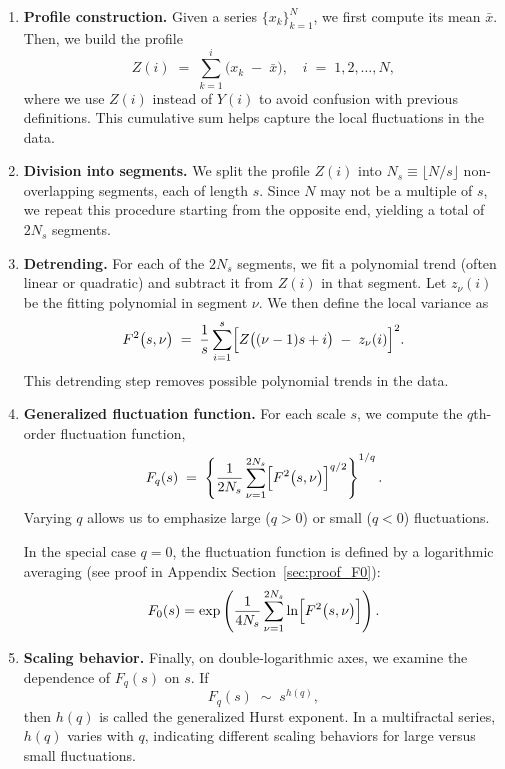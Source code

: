 \documentclass[11pt]{extarticle}
\begin{document}
\begin{enumerate}
    \item \textbf{Profile construction.} Given a series \(\{x_k\}_{k=1}^N\), we first compute its mean \(\bar{x}\). Then, we build the profile
    \begin{equation}
        Z(i) \;=\; \sum_{k=1}^{i} \bigl(x_k \;-\; \bar{x}\bigr), \quad i \;=\; 1,2,\dots,N,
    \end{equation}
    where we use \(Z(i)\) instead of \(Y(i)\) to avoid confusion with previous definitions. This cumulative sum helps capture the local fluctuations in the data.

    \item \textbf{Division into segments.} We split the profile \(Z(i)\) into \(N_s \equiv \lfloor N/s \rfloor\) non-overlapping segments, each of length \(s\). Since \(N\) may not be a multiple of \(s\), we repeat this procedure starting from the opposite end, yielding a total of \(2N_s\) segments.

    \item \textbf{Detrending.} For each of the \(2N_s\) segments, we fit a polynomial trend (often linear or quadratic) and subtract it from \(Z(i)\) in that segment. Let \(z_\nu(i)\) be the fitting polynomial in segment \(\nu\). We then define the local variance as
    \begin{equation}
        F^2\bigl(s,\nu\bigr)
        \;=\;
        \frac{1}{s} \sum_{i=1}^s \Bigl[ Z\bigl((\nu-1)s + i\bigr) \;-\; z_\nu(i) \Bigr]^2.
    \end{equation}
    This detrending step removes possible polynomial trends in the data.

    \item \textbf{Generalized fluctuation function.} For each scale \(s\), we compute the \(q\)th-order fluctuation function,
    \begin{equation}
        F_q(s)
        \;=\;
        \left\{
          \frac{1}{2N_s} \sum_{\nu=1}^{2N_s} \Bigl[ F^2\bigl(s,\nu\bigr) \Bigr]^{q/2}
        \right\}^{1/q}.
    \end{equation}
    Varying \(q\) allows us to emphasize large (\(q>0\)) or small (\(q<0\)) fluctuations.

    In the special case \(q=0\), the fluctuation function is defined by a logarithmic averaging (see proof in Appendix Section~\ref{sec:proof_F0}):
    \begin{equation}
        F_0(s) = \exp\left(\frac{1}{4N_s} \sum_{\nu=1}^{2N_s} \ln\Bigl[F^2\bigl(s,\nu\bigr)\Bigr]\right).
    \end{equation}


    \item \textbf{Scaling behavior.} Finally, on double-logarithmic axes, we examine the dependence of \(F_q(s)\) on \(s\). If
    \begin{equation}
        F_q(s) \;\sim\; s^{h(q)},
    \end{equation}
    then \(h(q)\) is called the generalized Hurst exponent. In a multifractal series, \(h(q)\) varies with \(q\),
    indicating different scaling behaviors for large versus small fluctuations.
\end{enumerate}
\end{document}
